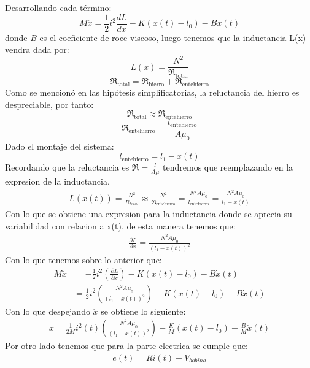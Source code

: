 \documentclass[
  11pt,
  letterpaper,
   addpoints,
   answers
  ]{exam}
\newcommand{\Rel}{\mathfrak{R}} %
\begin{document}
\begin{solution}
      Desarrollando cada término:
      \begin{equation}
        M \ddot{x} = \frac{1}{2} i^2 \frac{dL}{dx} - K(x(t)-l_0) - B \dot{x}(t)
      \end{equation}
      donde $B$ es el coeficiente de roce viscoso, luego tenemos que la inductancia L(x) vendra dada por:
      \begin{equation}
        L(x) = \frac{N^2}{\Rel_{\text{total}}}
      \end{equation}
      \begin{equation}
        \Rel_{\text{total}} = \Rel_{\text{hierro}} + \Rel_{\text{entehierro}}
      \end{equation}
      Como se mencionó en las hipótesis simplificatorias, la reluctancia del hierro es despreciable, por tanto:
      \begin{equation}
        \Rel_{\text{total}} \approx \Rel_{\text{entehierro}}
      \end{equation}
      \begin{equation}
        \Rel_{\text{entehierro}} = \frac{l_{\text{entehierro}}}{A \mu_0}
      \end{equation}
      Dado el montaje del sistema:
      \begin{equation}
        l_{\text{entehierro}} = l_1 - x(t)
      \end{equation}
    Recordando que la reluctancia es $\Rel= \frac{l}{A\mu}$ tendremos que reemplazando en la expresion de la inductancia.
    \begin{align}
      L(x(t)) = \frac{N^{2}}{R_{total}} \approx \frac{N^{2}}{\Rel_{\text{entehierro}}} = \frac{N^{2} A \mu_0}{l_{\text{entehierro}}} = \frac{N^{2} A \mu_0}{l_1 - x(t)}
    \end{align}
    Con lo que se obtiene una expresion para la inductancia donde se aprecia su variabilidad con relacion a x(t), de esta manera tenemos que:
    \begin{align}
        \frac{\partial L}{\partial x} = \frac{N^{2} A \mu_0}{(l_1 - x(t))^2}
    \end{align}
    Con lo que tenemos sobre lo anterior que:
    \begin{align}
      M \ddot{x} &= -\frac{1}{2} i^2 \left(\frac{\partial L}{\partial x}\right) - K(x(t)-l_0) - B \dot{x}(t)\\
      &= \frac{1}{2}i^{2}\left(\frac{N^{2}A\mu_0}{(l_1-x(t))^2}\right) - K(x(t)-l_0) - B \dot{x}(t)
    \end{align}
    Con lo que despejando $ \ddot{x}$ se obtiene lo siguiente:
    \begin{align}
      \ddot{x} = \frac{1}{2M}i^{2}(t) \left(\frac{N^{2}A\mu_0}{(l_1-x(t))^2}\right) - \frac{K}{M}(x(t)-l_0) - \frac{B}{M} \dot{x}(t)
    \end{align}
    Por otro lado tenemos que para la parte electrica se cumple que:
    \begin{align}
      e(t) = R i(t) + V_{bobina} 
    \end{align}
\end{solution}
\end{document}
